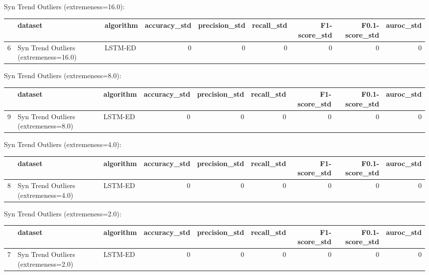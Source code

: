 Syn Trend Outliers (extremeness=16.0):

\begin{tabular}{rllrrrrrr}
\hline
    & dataset                               & algorithm   &   accuracy\_std &   precision\_std &   recall\_std &   F1-score\_std &   F0.1-score\_std &   auroc\_std \\
\hline
  6 & Syn Trend Outliers (extremeness=16.0) & LSTM-ED     &              0 &               0 &            0 &              0 &                0 &           0 \\
\hline
\end{tabular}

Syn Trend Outliers (extremeness=8.0):

\begin{tabular}{rllrrrrrr}
\hline
    & dataset                              & algorithm   &   accuracy\_std &   precision\_std &   recall\_std &   F1-score\_std &   F0.1-score\_std &   auroc\_std \\
\hline
  9 & Syn Trend Outliers (extremeness=8.0) & LSTM-ED     &              0 &               0 &            0 &              0 &                0 &           0 \\
\hline
\end{tabular}

Syn Trend Outliers (extremeness=4.0):

\begin{tabular}{rllrrrrrr}
\hline
    & dataset                              & algorithm   &   accuracy\_std &   precision\_std &   recall\_std &   F1-score\_std &   F0.1-score\_std &   auroc\_std \\
\hline
  8 & Syn Trend Outliers (extremeness=4.0) & LSTM-ED     &              0 &               0 &            0 &              0 &                0 &           0 \\
\hline
\end{tabular}

Syn Trend Outliers (extremeness=2.0):

\begin{tabular}{rllrrrrrr}
\hline
    & dataset                              & algorithm   &   accuracy\_std &   precision\_std &   recall\_std &   F1-score\_std &   F0.1-score\_std &   auroc\_std \\
\hline
  7 & Syn Trend Outliers (extremeness=2.0) & LSTM-ED     &              0 &               0 &            0 &              0 &                0 &           0 \\
\hline
\end{tabular}

